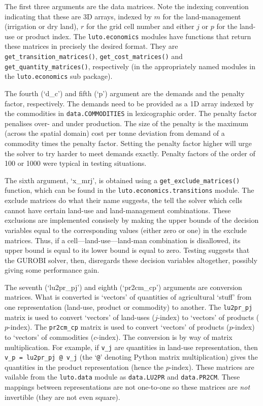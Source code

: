 \documentclass[12pt,a4paper,twoside]{article}
\begin{document}
The first three arguments are the data matrices. Note the indexing convention indicating that these are 3D arrays, indexed by $m$ for the land-management (irrigation or dry land), $r$ for the grid cell number and either $j$ or $p$ for the land-use or product index. The \texttt{luto.economics} modules have functions that return these matrices in precisely the desired format. They are \texttt{get_transition_matrices()}, \texttt{get_cost_matrices()} and \texttt{get_quantity_matrices()}, respectively (in the appropriately named modules in the \texttt{luto.economics} sub package).

The fourth (`d_c') and fifth (`p') argument are the demands and the penalty factor, respectively. The demands need to be provided as a 1D array indexed by the commodities in \texttt{data.COMMODITIES} in lexicographic order. The penalty factor penalises over- and under production. The size of the penalty is the maximum (across the spatial domain) cost per tonne deviation from demand of a commodity times the penalty factor. Setting the penalty factor higher will urge the solver to try harder to meet demands exactly. Penalty factors of the order of 100 or 1000 were typical in testing situations.

The sixth argument, `x_mrj', is obtained using a \texttt{get_exclude_matrices()} function, which can be found in the \texttt{luto.economics.transitions} module. The exclude matrices do what their name suggests, the tell the solver which cells cannot have certain land-use and land-management combinations. These exclusions are implemented consisely by making the upper bounds of the decision variables equal to the corresponding values (either zero or one) in the exclude matrices. Thus, if a cell---land-use---land-man combination is disallowed, its upper bound is equal to its lower bound is equal to zero. Testing suggests that the GUROBI solver, then, disregards these decision variables altogether, possibly giving some performance gain.

The seventh (`lu2pr_pj') and eighth (`pr2cm_cp') arguments are conversion matrices. What is converted is `vectors' of quantities of agricultural `stuff' from one representation (land-use, product or commodity) to another. The \texttt{lu2pr_pj} matrix is used to convert `vectors' of land-uses ($j$-index) to `vectors' of products ($p$-index). The \texttt{pr2cm_cp} matrix is used to convert `vectors' of products ($p$-index) to `vectors' of commodities ($c$-index). The conversion is by way of matrix multiplication. For example, if \texttt{v_j} are quantities in land-use representation, then \texttt{v_p = lu2pr_pj @ v_j} (the `\texttt{@}' denoting Python matrix multiplication) gives the quantities in the product representation (hence the $p$-index). These matrices are vailable from the \texttt{luto.data} module as \texttt{data.LU2PR} and \texttt{data.PR2CM}. These mappings between representations are not one-to-one so these matrices are \emph{not} invertible (they are not even square).
\end{document}
